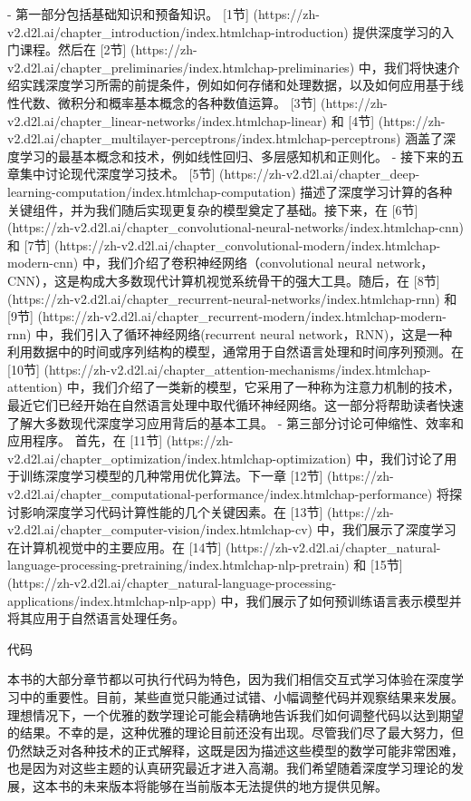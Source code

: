 - 第一部分包括基础知识和预备知识。 [1节]
(https://zh-v2.d2l.ai/chapter\_introduction/index.htmlchap-introduction) 
提供深度学习的入门课程。然后在 [2节]
(https://zh-v2.d2l.ai/chapter\_preliminaries/index.htmlchap-preliminaries) 
中，我们将快速介绍实践深度学习所需的前提条件，例如如何存储和处理数据，以及如何应用基于线性代数、微积分和概率基本概念的各种数值运算。 [3节]
(https://zh-v2.d2l.ai/chapter\_linear-networks/index.htmlchap-linear)
和 [4节]
(https://zh-v2.d2l.ai/chapter\_multilayer-perceptrons/index.htmlchap-perceptrons) 
涵盖了深度学习的最基本概念和技术，例如线性回归、多层感知机和正则化。
- 接下来的五章集中讨论现代深度学习技术。 [5节]
(https://zh-v2.d2l.ai/chapter\_deep-learning-computation/index.htmlchap-computation) 
描述了深度学习计算的各种关键组件，并为我们随后实现更复杂的模型奠定了基础。接下来，在 [6节]
(https://zh-v2.d2l.ai/chapter\_convolutional-neural-networks/index.htmlchap-cnn) 
和 [7节]
(https://zh-v2.d2l.ai/chapter\_convolutional-modern/index.htmlchap-modern-cnn) 
中，我们介绍了卷积神经网络（convolutional neural network，CNN），这是构成大多数现代计算机视觉系统骨干的强大工具。随后，在 [8节]
(https://zh-v2.d2l.ai/chapter\_recurrent-neural-networks/index.htmlchap-rnn) 
和 [9节]
(https://zh-v2.d2l.ai/chapter\_recurrent-modern/index.htmlchap-modern-rnn) 
中，我们引入了循环神经网络(recurrent neural network，RNN)，这是一种利用数据中的时间或序列结构的模型，通常用于自然语言处理和时间序列预测。在 [10节]
(https://zh-v2.d2l.ai/chapter\_attention-mechanisms/index.htmlchap-attention) 
中，我们介绍了一类新的模型，它采用了一种称为注意力机制的技术，最近它们已经开始在自然语言处理中取代循环神经网络。这一部分将帮助读者快速了解大多数现代深度学习应用背后的基本工具。
- 第三部分讨论可伸缩性、效率和应用程序。 首先，在 [11节]
(https://zh-v2.d2l.ai/chapter\_optimization/index.htmlchap-optimization) 
中，我们讨论了用于训练深度学习模型的几种常用优化算法。下一章 [12节]
(https://zh-v2.d2l.ai/chapter\_computational-performance/index.htmlchap-performance) 
将探讨影响深度学习代码计算性能的几个关键因素。在 [13节]
(https://zh-v2.d2l.ai/chapter\_computer-vision/index.htmlchap-cv) 
中，我们展示了深度学习在计算机视觉中的主要应用。在 [14节]
(https://zh-v2.d2l.ai/chapter\_natural-language-processing-pretraining/index.htmlchap-nlp-pretrain) 
和 [15节]
(https://zh-v2.d2l.ai/chapter\_natural-language-processing-applications/index.htmlchap-nlp-app)
 中，我们展示了如何预训练语言表示模型并将其应用于自然语言处理任务。



 代码

本书的大部分章节都以可执行代码为特色，因为我们相信交互式学习体验在深度学习中的重要性。目前，某些直觉只能通过试错、小幅调整代码并观察结果来发展。理想情况下，一个优雅的数学理论可能会精确地告诉我们如何调整代码以达到期望的结果。不幸的是，这种优雅的理论目前还没有出现。尽管我们尽了最大努力，但仍然缺乏对各种技术的正式解释，这既是因为描述这些模型的数学可能非常困难，也是因为对这些主题的认真研究最近才进入高潮。我们希望随着深度学习理论的发展，这本书的未来版本将能够在当前版本无法提供的地方提供见解。

